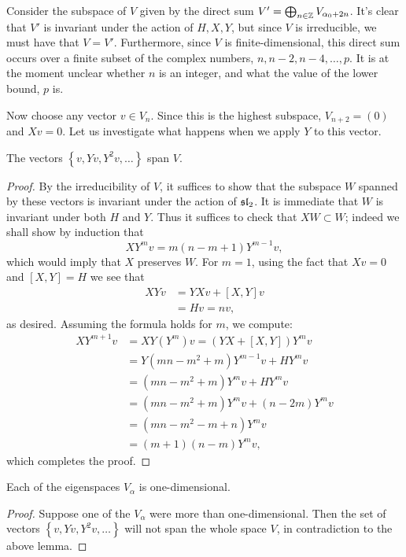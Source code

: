 \documentclass{../mathnotes}
\begin{document}
Consider the subspace of $V$ given by the direct sum $V'=\bigoplus_{n\in\mathbb{Z}}V_{\alpha_0+2n}$. It's clear that $V'$ is invariant under
the action of $H,X,Y$, but since $V$ is irreducible, we must have that $V=V'$. Furthermore, since $V$ is finite-dimensional, this direct sum
occurs over a finite subset of the complex numbers, $n,n-2,n-4,\ldots,p$. It is at the moment unclear whether $n$ is an integer, and what the value
of the lower bound, $p$ is.

Now choose any vector $v\in V_n$. Since this is the highest subspace, $V_{n+2}=(0)$ and $Xv=0$. Let us investigate what happens when we
apply $Y$ to this vector.

\begin{lem}
    The vectors $\left\{ v,Yv,Y^2v,\ldots \right\}$ span $V$.
\end{lem}
\begin{proof}
    By the irreducibility of $V$, it suffices to show that the subspace $W$ spanned by these vectors is invariant under the action of
    $\mathfrak{sl}_2$. It is immediate that $W$ is invariant under both $H$ and $Y$. Thus it suffices to check that $XW\subset W$; indeed we
    shall show by induction that
    \[XY^m v=m(n-m+1)Y^{m-1}v,\]
    which would imply that $X$ preserves $W$.
    For $m=1$, using the fact that $Xv=0$ and $[X,Y]=H$ we see that
    \begin{align*}
        XYv&=YXv+[X,Y]v\\
        &=Hv=nv,
    \end{align*}
    as desired. Assuming the formula holds for $m$, we compute:
    \begin{align*}
        XY^{m+1}v&=XY(Y^m)v=(YX+[X,Y])Y^mv\\
        &=Y\left( mn-m^2+m \right)Y^{m-1}v+HY^{m}v\\
        &=(mn-m^2+m)Y^{m}v+HY^mv\\
        &=(mn-m^2+m)Y^mv+(n-2m)Y^mv\\
        &=(mn-m^2-m+n)Y^mv\\
        &=(m+1)(n-m)Y^mv,
    \end{align*}
    which completes the proof.
\end{proof}

\begin{cor}
    Each of the eigenspaces $V_{\alpha}$ is one-dimensional.
\end{cor}
\begin{proof}
    Suppose one of the $V_\alpha$ were more than one-dimensional. Then the set of vectors $\left\{ v,Yv,Y^2v,\ldots \right\}$
    will not span the whole space $V$, in contradiction to the above lemma.
\end{proof}
\end{document}
